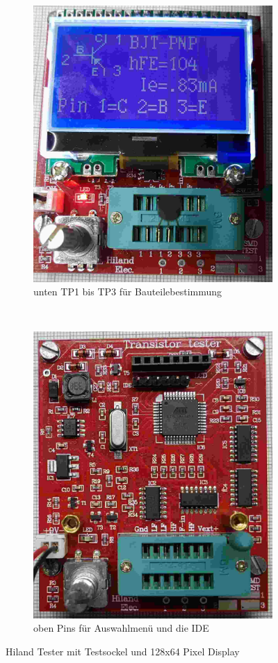 \begin{figure}[H]
  \begin{subfigure}[b]{.47\textwidth}	%
    \centering
    \includegraphics[width=.875\textwidth]{../PNG/Hi_u.jpg}  %
    \caption{unten TP1 bis TP3 für Bauteilebestimmung}
  \end{subfigure}
~
  \begin{subfigure}[b]{.5\textwidth}	%
    \centering
    \includegraphics[width=.756\textwidth]{../PNG/Hi_o.jpg}  %
    \caption{oben Pins für Auswahlmenü und die IDE}
  \end{subfigure}
  \caption{Hiland Tester mit Testsockel und 128x64 Pixel Display}
\label{fig:Hiland}
\end{figure}

